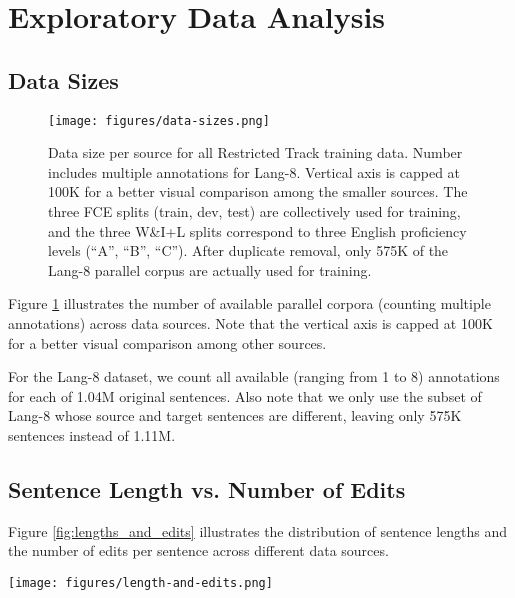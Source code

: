 \documentclass[11pt,a4paper]{article}
\begin{document}
\section{Exploratory Data Analysis}\label{app:exploratory}

\subsection{Data Sizes}

\begin{figure}[t]
    \centering
    \texttt{[image: figures/data-sizes.png]}
    \caption{Data size per source for all Restricted Track training data. Number includes multiple annotations for Lang-8. Vertical axis is capped at 100K for a better visual comparison among the smaller sources. The three FCE splits (train, dev, test) are collectively used for training, and the three W\&I+L splits correspond to three English proficiency levels (``A'', ``B'', ``C''). After duplicate removal, only 575K of the Lang-8 parallel corpus are actually used for training.}
    \label{fig:data_sizes}
\end{figure}

Figure \ref{fig:data_sizes} illustrates the number of available parallel corpora (counting multiple annotations) across data sources.
Note that the vertical axis is capped at 100K for a better visual comparison among other sources.

For the Lang-8 dataset, we count all available (ranging from 1 to 8) annotations for each of 1.04M original sentences.
Also note that we only use the subset of Lang-8 whose source and target sentences are different, leaving only 575K sentences instead of 1.11M. 


\subsection{Sentence Length vs. Number of Edits}

Figure \ref{fig:lengths_and_edits} illustrates the distribution of sentence lengths and the number of edits per sentence across different data sources. 

\begin{figure*}[t]
    \centering
    \texttt{[image: figures/length-and-edits.png]}
    \caption{Sentence length versus the number of edits made in each sentence, across all training data sources for the Restricted Track. The horizontal axis is capped at 100 words (less than 0.02\% of all sentences contain more than 100 words). The vertical axis is capped at 40 edits (less than 0.02\% of all sentences contain more than 30 edits).}
    \label{fig:lengths_and_edits}
\end{figure*}
\end{document}
